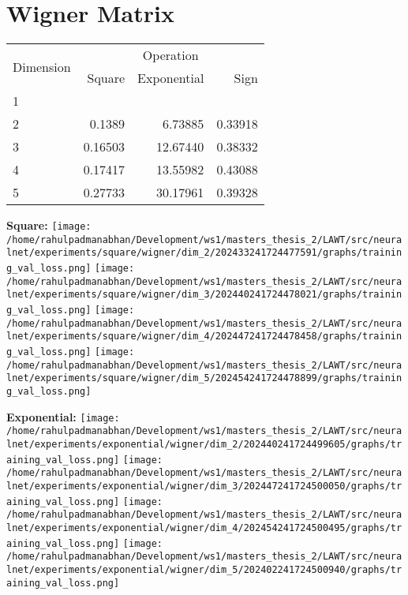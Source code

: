 \documentclass{article}
\begin{document}
\pagebreak
\section{Wigner Matrix}
\begin{tabular}{@{}lrrr@{}}
\toprule
\multirow{2}{*}{Dimension} & \multicolumn{3}{c}{Operation} \\
\cmidrule(l){2-4}
& Square & Exponential & Sign \\
\midrule
1 & & & \\
2 & 0.1389 & 6.73885 & 0.33918 \\
3 & 0.16503 & 12.67440 & 0.38332 \\
4 & 0.17417 & 13.55982 & 0.43088 \\
5 & 0.27733 & 30.17961 & 0.39328 \\
\bottomrule
\end{tabular}

\textbf{Square:}
\texttt{[image: /home/rahulpadmanabhan/Development/ws1/masters\_thesis\_2/LAWT/src/neuralnet/experiments/square/wigner/dim\_2/202433241724477591/graphs/training\_val\_loss.png]}
\texttt{[image: /home/rahulpadmanabhan/Development/ws1/masters\_thesis\_2/LAWT/src/neuralnet/experiments/square/wigner/dim\_3/202440241724478021/graphs/training\_val\_loss.png]}
\texttt{[image: /home/rahulpadmanabhan/Development/ws1/masters\_thesis\_2/LAWT/src/neuralnet/experiments/square/wigner/dim\_4/202447241724478458/graphs/training\_val\_loss.png]}
\texttt{[image: /home/rahulpadmanabhan/Development/ws1/masters\_thesis\_2/LAWT/src/neuralnet/experiments/square/wigner/dim\_5/202454241724478899/graphs/training\_val\_loss.png]}

\textbf{Exponential:}
\texttt{[image: /home/rahulpadmanabhan/Development/ws1/masters\_thesis\_2/LAWT/src/neuralnet/experiments/exponential/wigner/dim\_2/202440241724499605/graphs/training\_val\_loss.png]}
\texttt{[image: /home/rahulpadmanabhan/Development/ws1/masters\_thesis\_2/LAWT/src/neuralnet/experiments/exponential/wigner/dim\_3/202447241724500050/graphs/training\_val\_loss.png]}
\texttt{[image: /home/rahulpadmanabhan/Development/ws1/masters\_thesis\_2/LAWT/src/neuralnet/experiments/exponential/wigner/dim\_4/202454241724500495/graphs/training\_val\_loss.png]}
\texttt{[image: /home/rahulpadmanabhan/Development/ws1/masters\_thesis\_2/LAWT/src/neuralnet/experiments/exponential/wigner/dim\_5/202402241724500940/graphs/training\_val\_loss.png]}
\end{document}

